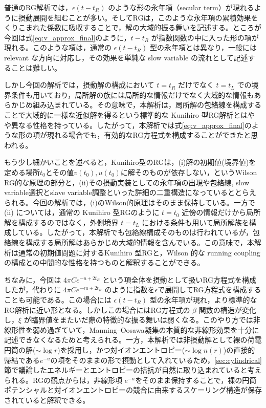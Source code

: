 \documentclass[11pt,a4paper]{ltjsarticle}
\theoremstyle{definition}
\theoremstyle{remark}
\begin{document}
\begin{cautionbox}[title=やや進んだ注釈]
普通のRG解析では，$\epsilon (t-t_R)$ のような形の永年項（secular term）が現れるように摂動展開を組むことが多い。そしてRGは，このような永年項の累積効果をくりこまれた係数に吸収することで，解の大域的振る舞いを記述する。ところが今回は式\eqref{eq:v_approx_final}のように，$t-t_R$ が指数関数の中に入った形の項が現れる。このような項は，通常の $\epsilon (t-t_R)$ 型の永年項とは異なり，一般には relevant な方向に対応し，その効果を単純な slow variable の流れとして記述することは難しい。

しかし今回の解析では，摂動解の構成において $t=t_R$ だけでなく $t=t_L$ での境界条件も用いており，局所解の族には局所的な情報だけでなく大域的な情報もあらかじめ組み込まれている。その意味で，本解析は，局所解の包絡線を構成することで大域的に一様な近似解を得るという標準的な Kunihiro 型RG解析とはやや異なる性格を持っている。したがって，本解析では式\eqref{eq:v_approx_final}のような形の項が現れる場合でも，有効的なRG方程式を構成することができたと思われる。

もう少し細かいことを述べると，Kunihiro型のRGは，(i)解の初期値(境界値)を定める場所$t_0$とその値$v(t_0),u(t_0)$に解そのものが依存しない，というWilson RG的な原理の部分と，(ii)その摂動実装としての永年項の出現や包絡線, slow variable選択とslave variable調整といった詳細の二重構造になっているととらえられる。今回の解析では，(i)のWilson的原理はそのまま保持している。一方で (ii) については，通常の Kunihiro 型RGのように
$t=t_0$ 近傍の情報だけから局所解を構成するのではなく，外側境界 $t=t_L$ における条件も用いて局所解族を構成している。したがって，本解析でも包絡線構成そのものは行われているが，包絡線を構成する局所解はあらかじめ大域的情報を含んでいる。この意味で，本解析は通常の初期値問題に対するKunihiro 型RGと，Wilson 的な running coupling の構成との中間的な性格を持つものと解釈することができる。

ちなみに，今回は $4\pi C e^{-u+2t_R}$ という項全体を摂動として扱いRG方程式を構成したが，代わりに $4\pi C e^{-\epsilon u+2t_R}$ のように指数を$\epsilon$で展開してRG方程式を構成することも可能である。この場合には $\epsilon (t-t_R)$ 型の永年項が現れ，より標準的なRG解析に近い形となる。しかしこの場合にはRG方程式の $\beta$ 関数の構造が変化し，$\xi$ が臨界値をまたいだ際の特徴的な振る舞いは弱くなる。このやり方では非線形性を弱め過ぎていて，Manning--Oosawa凝集の本質的な非線形効果を十分に記述できなくなるためと考えられる。一方，本解析では非摂動解として裸の荷電円筒の解($\sim \log r$)を採用し，かつ対イオンエントロピー($\sim \log n(r)$)の直接的帰結である$e^{-u}$の項をそのままの形で摂動として入れているため，\ref{sec:cylindrical}節で議論したエネルギーとエントロピーの拮抗が自然に取り込まれていると考えられる。RGの観点からは，非線形項 $e^{-u}$をそのまま保持することで，裸の円筒ポテンシャルと対イオンエントロピーの競合に由来するスケーリング構造が保存されていると解釈できる。
\end{cautionbox}
\end{document}
